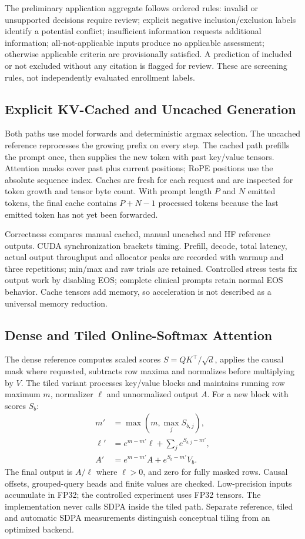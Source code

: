 \documentclass[conference]{IEEEtran}
\begin{document}
The preliminary application aggregate follows ordered rules: invalid or unsupported decisions require review; explicit negative inclusion/exclusion labels identify a potential conflict; insufficient information requests additional information; all-not-applicable inputs produce no applicable assessment; otherwise applicable criteria are provisionally satisfied. A prediction of included or not excluded without any citation is flagged for review. These are screening rules, not independently evaluated enrollment labels.

\subsection{Explicit KV-Cached and Uncached Generation}
Both paths use model forwards and deterministic argmax selection. The uncached reference reprocesses the growing prefix on every step. The cached path prefills the prompt once, then supplies the new token with past key/value tensors. Attention masks cover past plus current positions; RoPE positions use the absolute sequence index. Caches are fresh for each request and are inspected for token growth and tensor byte count. With prompt length $P$ and $N$ emitted tokens, the final cache contains $P+N-1$ processed tokens because the last emitted token has not yet been forwarded.

Correctness compares manual cached, manual uncached and HF reference outputs. CUDA synchronization brackets timing. Prefill, decode, total latency, actual output throughput and allocator peaks are recorded with warmup and three repetitions; min/max and raw trials are retained. Controlled stress tests fix output work by disabling EOS; complete clinical prompts retain normal EOS behavior. Cache tensors add memory, so acceleration is not described as a universal memory reduction.

\subsection{Dense and Tiled Online-Softmax Attention}
The dense reference computes scaled scores $S=QK^\top/\sqrt d$, applies the causal mask where requested, subtracts row maxima and normalizes before multiplying by $V$. The tiled variant processes key/value blocks and maintains running row maximum $m$, normalizer $\ell$ and unnormalized output $A$. For a new block with scores $S_b$:
\begin{align}
m'&=\max(m,\max_j S_{b,j}),\\
\ell'&=e^{m-m'}\ell+\sum_j e^{S_{b,j}-m'},\\
A'&=e^{m-m'}A+e^{S_b-m'}V_b.
\end{align}
The final output is $A/\ell$ where $\ell>0$, and zero for fully masked rows. Causal offsets, grouped-query heads and finite values are checked. Low-precision inputs accumulate in FP32; the controlled experiment uses FP32 tensors. The implementation never calls SDPA inside the tiled path. Separate reference, tiled and automatic SDPA measurements distinguish conceptual tiling from an optimized backend.
\end{document}
